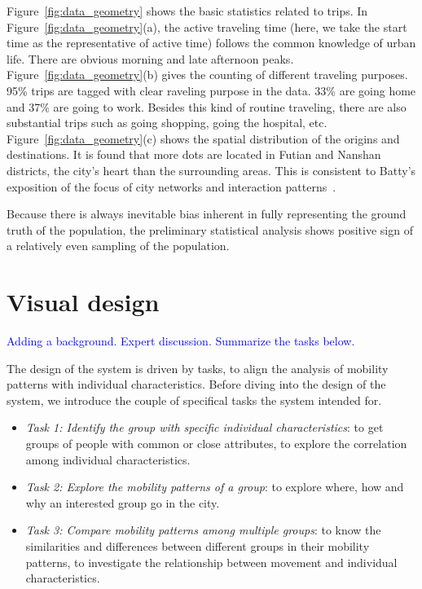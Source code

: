 Figure~\ref{fig:data_geometry} shows the basic statistics related to trips. In Figure~\ref{fig:data_geometry}(a), the active traveling time (here, we take the start time as the representative of active time) follows the common knowledge of urban life. There are obvious morning and late afternoon peaks. Figure~\ref{fig:data_geometry}(b) gives the counting of different traveling purposes. 95\% trips are tagged with clear raveling purpose in the data. 33\% are going home and 37\% are going to work. Besides this kind of routine traveling, there are also substantial trips such as going shopping, going the hospital, etc. Figure~\ref{fig:data_geometry}(c) shows the spatial distribution of the origins and destinations. It is found that more dots are located in Futian and Nanshan districts, the city's heart than the surrounding areas. This is consistent to Batty's exposition of the focus of city networks and interaction patterns~\citep{batty2013new}.



Because there is always inevitable bias inherent in fully representing the ground truth of the population, the preliminary statistical analysis shows positive sign of a relatively even sampling of the population.


\section{Visual design}

\textcolor{blue}{Adding a background. Expert discussion. Summarize the tasks below.}

The design of the system is driven by tasks, to align the analysis of mobility patterns with individual characteristics. Before diving into the design of the system, we introduce the couple of specifical tasks the system intended for.

\begin{itemize}
\item \textit{Task 1: Identify the group with specific individual characteristics}: to get groups of people with common or close attributes, to explore the correlation among individual characteristics.
\item \textit{Task 2: Explore the mobility patterns of a group}: to explore where, how and why an interested group go in the city.
\item \textit{Task 3: Compare mobility patterns among multiple groups}: to know the similarities and differences between different groups in their mobility patterns, to investigate the relationship between movement and individual characteristics.
\end{itemize}

